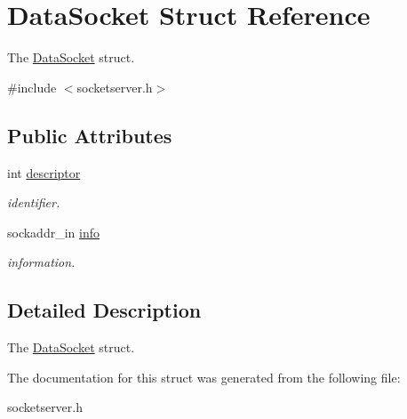 \hypertarget{structDataSocket}{}\section{Data\+Socket Struct Reference}
\label{structDataSocket}


The \hyperlink{structDataSocket}{Data\+Socket} struct.  




{\ttfamily \#include $<$socketserver.\+h$>$}

\subsection*{Public Attributes}
\begin{DoxyCompactItemize}
\item 
int \hyperlink{structDataSocket_a36208fdb5bdecfb536f2b216f31c6a90}{descriptor}\hypertarget{structDataSocket_a36208fdb5bdecfb536f2b216f31c6a90}{}\label{structDataSocket_a36208fdb5bdecfb536f2b216f31c6a90}

\begin{DoxyCompactList}\small\item\em identifier. \end{DoxyCompactList}\item 
sockaddr\+\_\+in \hyperlink{structDataSocket_a68cf3c516272641695f0272ab5f33c78}{info}\hypertarget{structDataSocket_a68cf3c516272641695f0272ab5f33c78}{}\label{structDataSocket_a68cf3c516272641695f0272ab5f33c78}

\begin{DoxyCompactList}\small\item\em information. \end{DoxyCompactList}\end{DoxyCompactItemize}


\subsection{Detailed Description}
The \hyperlink{structDataSocket}{Data\+Socket} struct. 

The documentation for this struct was generated from the following file\+:\begin{DoxyCompactItemize}
\item 
socketserver.\+h\end{DoxyCompactItemize}

